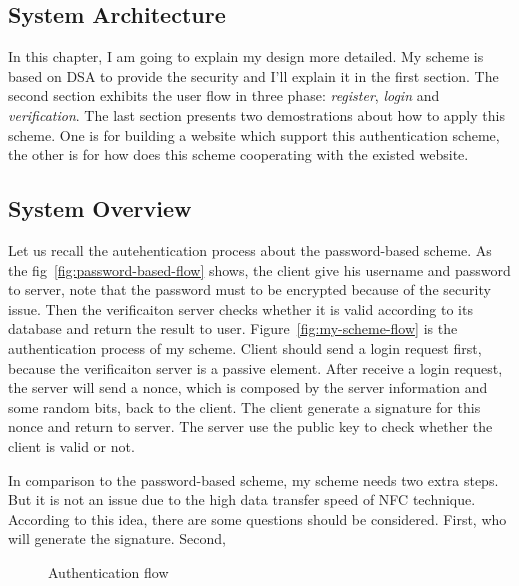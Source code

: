 \begin{CJK}{Bg5}{bsmi}


\chapter{System Architecture}

In this chapter, I am going to explain my design more detailed. My scheme is based on DSA to provide the security and I'll explain it in the first section. The second section exhibits the user flow in three phase: \emph{register}, \emph{login} and \emph{verification}. The last section presents two demostrations about how to apply this scheme. One is for building a website which support this authentication scheme, the other is for how does this scheme cooperating with the existed website.

\section{System Overview}

Let us recall the autehentication process about the password-based scheme. As the fig~\ref{fig:password-based-flow} shows, the client give his username and password to server, note that the password must to be encrypted because of the security issue. Then the verificaiton server checks whether it is valid according to its database and return the result to user. Figure~\ref{fig:my-scheme-flow} is the authentication process of my scheme. Client should send a login request first, because the verificaiton server is a passive element. After receive a login request, the server will send a nonce, which is composed by the server information and some random bits, back to the client. The client generate a signature for this nonce and return to server. The server use the public key to check whether the client is valid or not.

In comparison to the password-based scheme, my scheme needs two extra steps. But it is not an issue due to the high data transfer speed of NFC technique. According to this idea, there are some questions should be considered. First, who will generate the signature. Second, 

\begin{figure}
\centering
{}
\caption{Authentication flow}
\end{figure}


\end{CJK}
